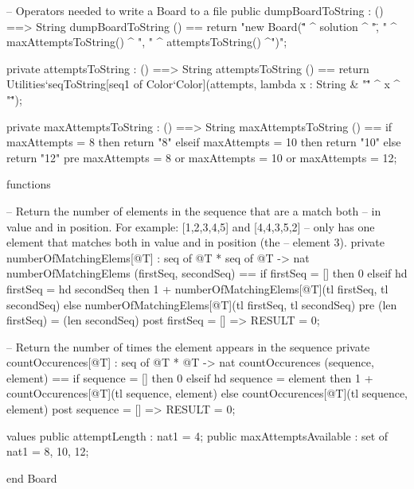 \documentclass{article}
\begin{document}
\begin{vdm_al}
    -- Operators needed to write a Board to a file
    public dumpBoardToString : () ==> String
    dumpBoardToString () ==
      return "new Board(\"" ^ solution ^ "\", " ^ maxAttemptsToString()
        ^ ", " ^ attemptsToString() ^")";

    private attemptsToString : () ==> String
    attemptsToString () ==
      return Utilities`seqToString[seq1 of Color`Color](attempts,
        lambda x : String & "\"" ^ x ^ "\"");

    private maxAttemptsToString : () ==> String
    maxAttemptsToString () ==
      if maxAttempts = 8 then return "8"
      elseif maxAttempts = 10 then return "10"
      else return "12"
    pre maxAttempts = 8 or maxAttempts = 10 or maxAttempts = 12;


  functions

    -- Return the number of elements in the sequence that are a match both
    -- in value and in position. For example: [1,2,3,4,5] and [4,4,3,5,2]
    -- only has one element that matches both in value and in position (the
    -- element 3).
    private numberOfMatchingElems[@T] : seq of @T * seq of @T -> nat
      numberOfMatchingElems (firstSeq, secondSeq) ==
        if firstSeq = [] then
          0
        elseif hd firstSeq = hd secondSeq then
          1 + numberOfMatchingElems[@T](tl firstSeq, tl secondSeq)
        else
          numberOfMatchingElems[@T](tl firstSeq, tl secondSeq)
      pre (len firstSeq) = (len secondSeq)
      post firstSeq = [] => RESULT = 0;

    -- Return the number of times the element appears in the sequence
    private countOccurences[@T] : seq of @T * @T -> nat
      countOccurences (sequence, element) ==
        if sequence = [] then
          0
        elseif hd sequence = element then
          1 + countOccurences[@T](tl sequence, element)
        else
          countOccurences[@T](tl sequence, element)
      post sequence = [] => RESULT = 0;


  values
    public attemptLength : nat1 = 4;
    public maxAttemptsAvailable : set of nat1 = {8, 10, 12};

end Board
\end{vdm_al}
\end{document}
